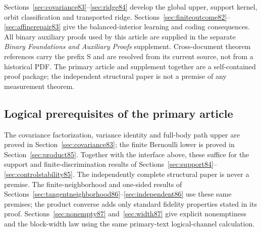 Sections~\ref{sec:covariance83}--\ref{sec:ridge84} develop the global
upper, support kernel, orbit classification and transported ridge.
Sections~\ref{sec:finiteoutcome82}--\ref{sec:affinerepair83} give the
balanced-interior learning and coding consequences.
All binary auxiliary proofs used by this article are supplied in the
separate \emph{Binary Foundations and Auxiliary Proofs} supplement.
Cross-document theorem references carry the prefix S and are resolved
from its current source, not from a historical PDF.  The primary article
and supplement together are a self-contained proof package; the
independent structural paper is not a premise of any measurement theorem.

\subsection{Logical prerequisites of the primary article}
The covariance factorization, variance identity and full-body path
upper are proved in Section~\ref{sec:covariance83}; the finite
Bernoulli lower is proved in Section~\ref{sec:product85}.  Together
with the interface above, these suffice for the support and
finite-discrimination results of
Sections~\ref{sec:support84}--\ref{sec:controlstability85}.
The independently complete structural paper is never a premise.
The finite-neighborhood and one-sided results of
Sections~\ref{sec:tangentneighborhood86}--\ref{sec:independent86}
use these same premises; the product converse adds only standard
fidelity properties stated in its proof.  Sections~\ref{sec:nonempty87}
and~\ref{sec:width87} give explicit nonemptiness and the block-width
law using the same primary-text logical-channel calculation.

